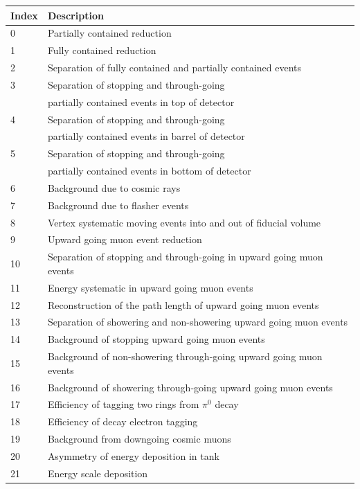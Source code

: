 \begin{table}[ht!]
\begin{tabular}{ll}
    \hline Index & Description \\ 
    \hline
    0 & Partially contained reduction  \\
    1 & Fully contained reduction \\
    2 & Separation of fully contained and partially contained events \\
    3 & Separation of stopping and through-going\\
      & \hspace{0.4cm} partially contained events in top of detector \\
    4 & Separation of stopping and through-going\\
      & \hspace{0.4cm} partially contained events in barrel of detector \\
    5 & Separation of stopping and through-going\\
      & \hspace{0.4cm} partially contained events in bottom of detector \\
    6 & Background due to cosmic rays \\
    7 & Background due to flasher events \\
    8 & Vertex systematic moving events into and out of fiducial volume \\
    9 & Upward going muon event reduction \\
    10 & Separation of stopping and through-going in upward going muon events \\
    11 & Energy systematic in upward going muon events \\
    12 & Reconstruction of the path length of upward going muon events \\
    13 & Separation of showering and non-showering upward going muon events \\
    14 & Background of stopping upward going muon events \\
    15 & Background of non-showering through-going upward going muon events \\
    16 & Background of showering through-going upward going muon events \\
    17 & Efficiency of tagging two rings from $\pi^0$ decay \\
    18 & Efficiency of decay electron tagging \\
    19 & Background from downgoing cosmic muons \\
    20 & Asymmetry of energy deposition in tank \\
    21 & Energy scale deposition \\
    \hline
  \end{tabular}
\end{table}

